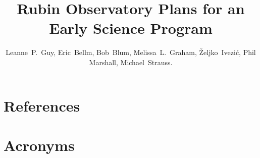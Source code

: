 \documentclass[DM,authoryear,toc]{lsstdoc}
\title{Rubin Observatory Plans for an Early Science Program}
\author{%
Leanne~P.~Guy, Eric~Bellm, Bob~Blum, Melissa~L.~Graham,
\v{Z}eljko~Ivezi\'{c}, Phil Marshall, Michael~Strauss.}
\date{\vcsDate}
\begin{document}
\maketitle


\clearpage










\appendix
\section{References} \label{sec:bib}
\renewcommand{\refname}{} %


\section{Acronyms} \label{sec:acronyms}

\end{document}
